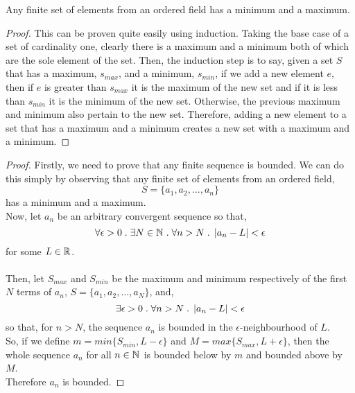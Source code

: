 \documentclass[../MathsNotesBase.tex]{subfiles}
\begin{document}
{		\bigskip
		\begin{lemma}
			Any finite set of elements from an ordered field has a minimum and a maximum.
		\end{lemma}
		\begin{proof}
			This can be proven quite easily using induction. Taking the base case of a set of cardinality one, clearly there is a maximum and a minimum both of which are the sole element of the set. Then, the induction step is to say, given a set $S$ that has a maximum, $s_{max}$, and a minimum, $s_{min}$, if we add a new element $e$, then if $e$ is greater than $s_{max}$ it is the maximum of the new set and if it is less than $s_{min}$ it is the minimum of the new set. Otherwise, the previous maximum and minimum also pertain to the new set. Therefore, adding a new element to a set that has a maximum and a minimum creates a new set with a maximum and a minimum.
		\end{proof}
		\bigskip
		\begin{proof}
			Firstly, we need to prove that any finite sequence is bounded. We can do this simply by observing that any finite set of elements from an ordered field,
			\[ S = \{a_1, a_2, \dots , a_n\} \]
			has a minimum and a maximum.\\
			Now, let $a_n$ be an arbitrary convergent sequence so that,
			\[ \forall \epsilon > 0 \;.\; \exists N \in \mathbb{N}^{} \;.\; \forall n > N \;.\; \left\lvert a_n - L\right\rvert < \epsilon \]
			for some $L \in \mathbb{R}^{}$.\\\\
			Then, let $S_{max}$ and $S_{min}$ be the maximum and minimum respectively of the first $N$ terms of $a_n$, $S = \{a_1, a_2, \dots , a_N\}$, and,
			\[ \exists \epsilon > 0 \;.\; \forall n > N \;.\; \left\lvert a_n - L\right\rvert < \epsilon \]
			so that, for $n > N$, the sequence $a_n$ is bounded in the $\epsilon$-neighbourhood of $L$.\\
			So, if we define ${ m = min\{S_{min}, L - \epsilon\} }$ and ${ M = max\{S_{max}, L + \epsilon\} }$, then the whole sequence $a_n$ for all $n \in \mathbb{N}^{}$ is bounded below by $m$ and bounded above by $M$.\\
			Therefore $a_n$ is bounded. 
		\end{proof}
	
		\bigskip
		
}
\end{document}
